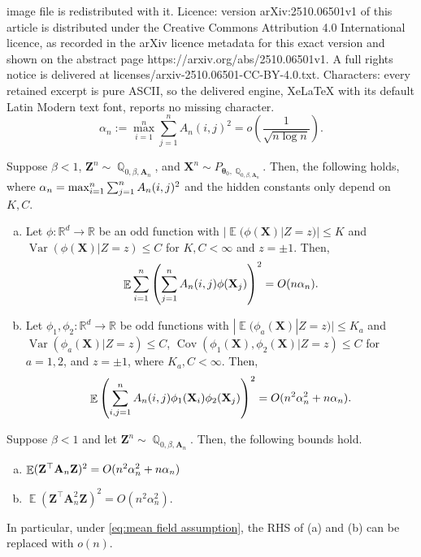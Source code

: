 \documentclass[10pt,a4paper]{amsart}
\DeclareMathOperator{\Cov}{Cov}
\DeclareMathOperator{\EE}{\mathbb{E}}
\DeclareMathOperator{\QQ}{\mathbb{Q}}
\DeclareMathOperator{\Var}{Var}
\DeclareMathOperator{\sumij}{\sum_{\mathnormal{ i,j}=1}^{\mathnormal n}}
\DeclareMathOperator{\sumin}{\sum_{\mathnormal i=1}^{\mathnormal n}}
\DeclareMathOperator{\sumjn}{\sum_{\mathnormal j=1}^{\mathnormal n}}
\newcommand{\A}{\mathbf{A}}
\newcommand{\X}{\mathbf{X}}
\newcommand{\Z}{\mathbf{Z}}
\newcommand{\an}{\alpha_{\mathnormal n}}
\newcommand{\ttheta}{\boldsymbol{\theta}}
\begin{document}
image file is redistributed with it. Licence: version arXiv:2510.06501v1 of this article is distributed under the Creative Commons Attribution 4.0 International licence, as recorded in the arXiv licence metadata for this exact version and shown on the abstract page https://arxiv.org/abs/2510.06501v1. A full rights notice is delivered at licenses/arxiv-2510.06501-CC-BY-4.0.txt. Characters: every retained excerpt is pure ASCII, so the delivered engine, XeLaTeX with its default Latin Modern text font, reports no missing character.
    \begin{equation}\label{eq:mean field assumption}
    \alpha_n := \max_{i=1}^n \sum_{j=1}^n A_n(i,j)^2 =o \left( \frac{1}{\sqrt{n \log n}} \right).
    \end{equation}

\begin{lemma}\label{lem:conditional sum}
    Suppose $\beta <1$, $\Z^n \sim \QQ_{0,\beta, \A_n}$, and $\X^n \sim P_{\ttheta_0,\QQ_{0,\beta, \A_n}}$. Then, the following holds, where $\an = \max_{i=1}^n \sumjn A_n(i,j)^2$ and the hidden constants only depend on $K, C$.
    \begin{enumerate}[(a)]
    \item Let $\phi: \mathbb{R}^d \to \mathbb{R}$ be an odd function with $|\EE(\phi(\X) | Z = z)| \le K$ and $\Var(\phi(\X) | Z = z) \le C$ for $K, C < \infty$ and $z = \pm 1$. Then,
    \begin{equation*}
        \EE \sumin \left(\sumjn A_n(i,j) \phi(\X_j) \right)^2 = O(n \an).
    \end{equation*}
    \item Let $\phi_1, \phi_2: \mathbb{R}^d \to \mathbb{R}$ be odd functions with $|\EE(\phi_a(\X) | Z = z)| \le K_a$ and $\Var(\phi_a(\X) | Z = z) \le C$, $\Cov (\phi_1(\X), \phi_2(\X) | Z = z) \le C$ for $a = 1,2$, and $z = \pm 1$, where $K_a, C < \infty$. Then,
    $$\EE \left( \sumij A_n(i,j) \phi_1(\X_i) \phi_2(\X_j) \right)^2 = O(n^2 \alpha_n^2 + n\an).$$
    \end{enumerate}
    \end{lemma}

\begin{lemma}\label{lem:Ising moment concentration}
    Suppose $\beta < 1$ and let $\Z^n \sim \QQ_{0, \beta, \A_n}$. Then, the following bounds hold.
    \begin{enumerate}[(a)]
        \item $\EE (\Z^\top \A_n \Z)^2 = O(n^2 \alpha_n^2 + n\an)$
        \item $\EE (\Z^\top \A_n^2 \Z)^2 %
        = O(n^2 \alpha_n^2)$.
    \end{enumerate}
    In particular, under \eqref{eq:mean field assumption}, the RHS of (a) and (b) can be replaced with $o(n)$. %
\end{lemma}
\end{document}
